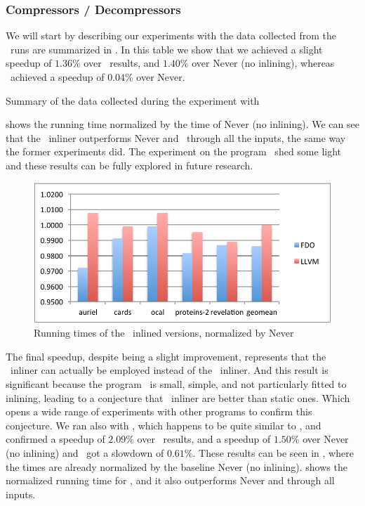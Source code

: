 \subsubsection{Compressors / Decompressors}

We will start by describing our experiments with the data collected from the \bzip\ runs are summarized in . In this table we show that we achieved a slight speedup of $1.36 \%$ over \llvm\ results, and $1.40 \%$ over Never (no inlining), whereas \llvm\ achieved a speedup of $0.04 \%$ over Never.

\begin{table}
  \centering
  \begin{tiny}
  
  \end{tiny}
  \caption{Summary of the data collected during the experiment with \bzip}
  \label{tab:speedupb}
\end{table}

 shows the running time normalized by the time of Never (no inlining). We can see that the \FDI\ inliner outperforms Never and \llvm\ through all the inputs, the same way the former experiments did. The experiment on the program \bzip\ shed some light and these results can be fully explored in future research.

\begin{figure}
  \centering
  \includegraphics[width=1.00\linewidth]{Figures/speedupb}
  \caption{Running times of the \bzip\ inlined versions, normalized by Never}
  \label{fig:speedup}
\end{figure}

The final speedup, despite being a slight improvement, represents that the \FDI\ inliner can actually be employed instead of the \llvm\ inliner. And this result is significant because the program \bzip\ is small, simple, and not particularly fitted to inlining, leading to a conjecture that \FDI\ inliner are better than static ones. Which opens a wide range of experiments with other programs to confirm this conjecture. We ran also with \gzip, which happens to be quite similar to \bzip, and confirmed a speedup of $2.09 \%$ over \llvm\ results, and a speedup of $1.50 \%$ over Never (no inlining) and \llvm\ got a slowdown of $0.61 \%$. These results can be seen in , where the times are already normalized by the baseline Never (no inlining).  shows the normalized running time for \gzip, and it also outperforms Never and \llvm through all inputs.

